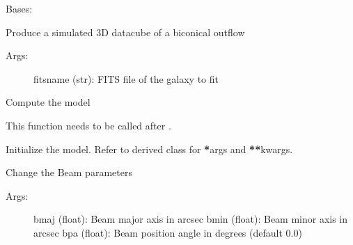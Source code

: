 \documentclass[letterpaper,10pt,english]{sphinxmanual}
\begin{document}

\begin{fulllineitems}
\label{\detokenize{pybb_api:pyBBarolo.pyBBarolo.GalWind}}
Bases: {\hyperref[\detokenize{pybb_api:pyBBarolo.pyBBarolo.Model3D}]{}}

Produce a simulated 3D datacube of a biconical outflow
\begin{description}
\item[{Args:}] \leavevmode
fitsname (str): FITS file of the galaxy to fit

\end{description}

\begin{fulllineitems}
\label{\detokenize{pybb_api:pyBBarolo.pyBBarolo.GalWind.compute}}
Compute the model

This function needs to be called after {\hyperref[\detokenize{pybb_api:pyBBarolo.pyBBarolo.GalWind.init}]{}}.

\end{fulllineitems}


\begin{fulllineitems}
\label{\detokenize{pybb_api:pyBBarolo.pyBBarolo.GalWind.init}}
Initialize the model. Refer to derived class for {\color{red}\bfseries{}*}args and {\color{red}\bfseries{}**}kwargs.

\end{fulllineitems}


\begin{fulllineitems}
\label{\detokenize{pybb_api:pyBBarolo.pyBBarolo.GalWind.set_beam}}
Change the Beam parameters
\begin{description}
\item[{Args:}] \leavevmode
bmaj (float): Beam major axis in arcsec
bmin (float): Beam minor axis in arcsec
bpa  (float): Beam position angle in degrees (default 0.0)


\end{description}
\end{fulllineitems}
\end{fulllineitems}
\end{document}
